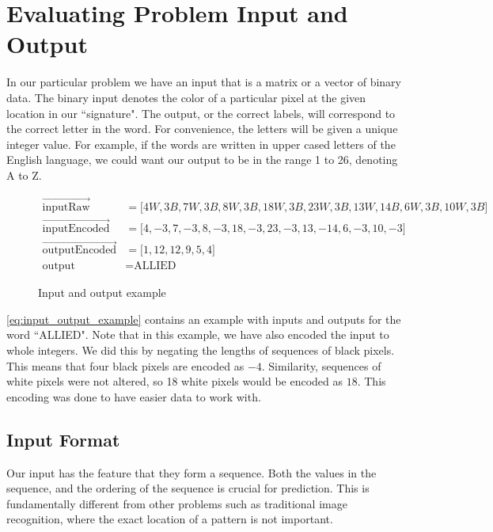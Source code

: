 \section{Evaluating Problem Input and Output}
\label{sec:evaluating_problem_input_and_output}
In our particular problem we have an input that is a matrix or a vector of binary data. The binary input denotes the color of a particular pixel at the given location in our ``signature". The output, or the correct labels, will correspond to the correct letter in the word. For convenience, the letters will be given a unique integer value. For example, if the words are written in upper cased letters of the English language, we could want our output to be in the range 1 to 26, denoting A to Z.

\begin{figure}[h]
    \begin{equation}
        \label{eq:input_output_example}
        \begin{aligned}
           \vec{\text{inputRaw}}               &= \lbrack 4W, 3B, 7W, 3B, 8W, 3B, 18W, 3B, 23W, 3B, 13W, 14B, 6W, 3B, 10W, 3B \rbrack \\
           \vec{\text{inputEncoded}}           &= \lbrack 4, -3, 7, -3, 8, -3, 18, -3, 23, -3, 13, -14, 6, -3, 10, -3 \rbrack \\
           \vec{\text{outputEncoded}}          &= \lbrack 1, 12, 12, 9, 5, 4 \rbrack \\
           \text{output}                       &= \text{ALLIED}
        \end{aligned}
    \end{equation}
    \captionsetup{labelformat=empty}
    \caption{Input and output example}
\end{figure}

\ref{eq:input_output_example} contains an example with inputs and outputs for the word ``ALLIED". Note that in this example, we have also encoded the input to whole integers. We did this by negating the lengths of sequences of black pixels. This means that four black pixels are encoded as $-4$. Similarity, sequences of white pixels were not altered, so 18 white pixels would be encoded as $18$. This encoding was done to have easier data to work with. 

\subsection{Input Format}
Our input has the feature that they form a sequence. Both the values in the sequence, and the ordering of the sequence is crucial for prediction. This is fundamentally different from other problems such as traditional image recognition, where the exact location of a pattern is not important.

